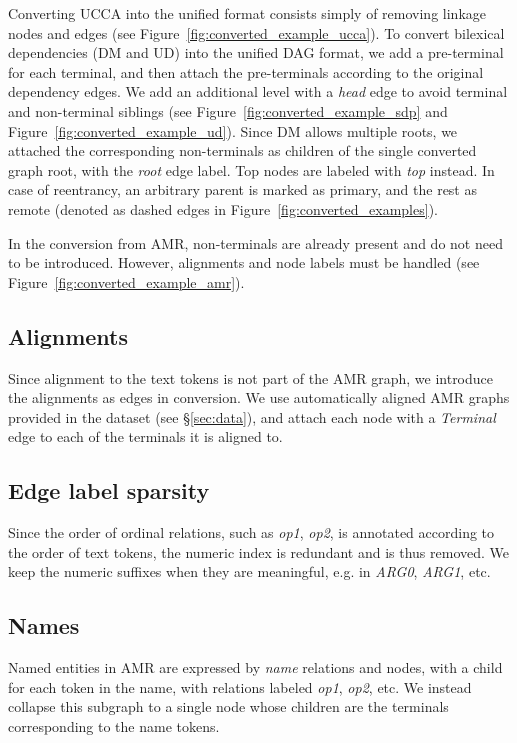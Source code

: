 \documentclass[11pt,a4paper]{article}
\begin{document}
Converting UCCA into the unified format consists simply of removing linkage nodes
and edges (see Figure~\ref{fig:converted_example_ucca}).
To convert bilexical dependencies (DM and UD) into the unified DAG format,
we add a pre-terminal for each terminal,
and then attach the pre-terminals according to the original dependency edges.
We add an additional level with a \textit{head} edge to avoid terminal and non-terminal siblings
(see Figure~\ref{fig:converted_example_sdp} and Figure~\ref{fig:converted_example_ud}).
Since DM allows multiple roots, we attached the corresponding non-terminals as children of
the single converted graph root, with the \textit{root} edge label.
Top nodes are labeled with \textit{top} instead.
In case of reentrancy, an arbitrary parent is marked as primary, and the rest as remote
(denoted as dashed edges in Figure~\ref{fig:converted_examples}).

In the conversion from AMR, non-terminals are already present and do not need to be introduced.
However, alignments and node labels must be handled
(see Figure~\ref{fig:converted_example_amr}).

\subsection{Alignments}
Since alignment to the text tokens is not part of the AMR graph,
we introduce the alignments as edges in conversion.
We use automatically aligned AMR graphs provided in the dataset (see \S\ref{sec:data}),
and attach each node with a \textit{Terminal} edge to each of the terminals it is aligned to.

\subsection{Edge label sparsity}
Since the order of ordinal relations, such as \textit{op1}, \textit{op2},
is annotated according to the order of text tokens,
the numeric index is redundant and is thus removed.
We keep the numeric suffixes when they are meaningful, e.g. in \textit{ARG0}, \textit{ARG1}, etc.

\subsection{Names}
Named entities in AMR are expressed by \textit{name} relations and nodes, with
a child for each token in the name, with relations labeled \textit{op1}, \textit{op2}, etc.
We instead collapse this subgraph to a single node whose children are the terminals
corresponding to the name tokens.
\end{document}
